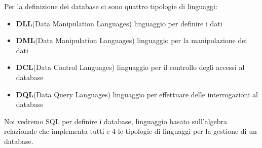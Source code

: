 \documentclass[a4paper,12pt, oneside]{book}
\begin{document}
Per la definizione dei database ci sono quattro tipologie di linguaggi:
\begin{itemize}
        \item \textbf{DLL}(Data Manipulation Languages) linguaggio per definire i dati
        \item \textbf{DML}(Data Manipulation Languages) linguaggio per la manipolazione dei dati
        \item \textbf{DCL}(Data Control Languages) linguaggio per il controllo degli accessi al database
        \item \textbf{DQL}(Data Query Languages) linguaggio per effettuare delle interrogazioni al database
\end{itemize}
Noi vedremo SQL per definire i database, linguaggio basato sull'algebra relazionale che implementa tutti e 4 le tipologie 
di linguaggi per la gestione di un database.
\end{document}
